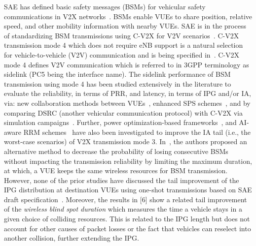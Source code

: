 \documentclass[conference]{IEEEtran}
\begin{document}
SAE has defined basic safety messages (BSMs) for vehicular safety communications in V2X networks~\cite{J2735}. BSMs enable VUEs to share position, relative speed, and other mobility information with nearby VUEs. SAE is in the process of standardizing BSM transmissions using C-V2X for V2V scenarios~\cite{J3161}. C-V2X transmission mode 4 which does not require eNB support is a natural selection for vehicle-to-vehicle (V2V) communication and is being specified in~\cite{J3161}. C-V2X mode 4 defines V2V communication which is referred to in 3GPP terminology as sidelink (PC5 being the interface name). The sidelink performance of BSM transmission using mode 4 has been studied extensively in the literature to evaluate the reliability, in terms of PRR, and latency, in terms of IPG and/or IA, via: new collaboration methods between VUEs~\cite{piggyback}, enhanced SPS schemes~\cite{AugRA}, and by comparing DSRC (another vehicular communication protocol) with C-V2X via simulation campaigns~\cite{toyota}. Further, power optimization-based frameworks~\cite{ProbAoI1}, and AI-aware RRM schemes~\cite{RRM} have also been investigated to improve the IA tail (i.e., the worst-case scenarios) of V2X transmission mode 3. In~\cite{bspots}, the authors proposed an alternative method to decrease the probability of losing consecutive BSMs without impacting the transmission reliability by limiting the maximum duration, at which, a VUE keeps the same wireless resources for BSM transmission. However, none of the prior studies have discussed the tail improvement of the IPG distribution at destination VUEs using one-shot transmissions based on SAE draft specification~\cite{J3161}. Moreover, the results in [6] show a related tail improvement of the \textit{wireless blind spot duration} which measures the time a vehicle stays in a given choice of colliding resources. This is related to the IPG length but does not account for other causes of packet losses or the fact that vehicles can reselect into another collision, further extending the IPG.
\end{document}
